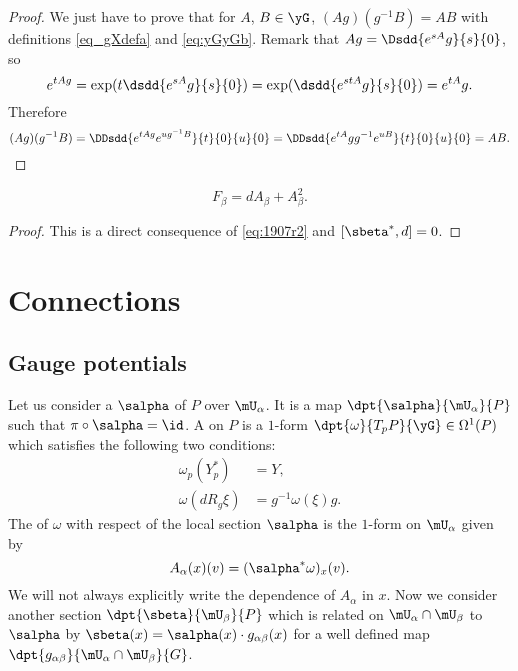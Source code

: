 \begin{proof}
We just have to prove that for $A$, $B\in\yG$, $(Ag)(g^{-1} B)=AB$ with definitions \eqref{eq_gXdefa} and \eqref{eq:yGyGb}. Remark that $Ag=\Dsdd{e^{sA}g}{s}{0}$, so
\[
  e^{tAg}=\exp(t\dsdd{e^{sA}g}{s}{0})=\exp(\dsdd{e^{stA}g}{s}{0})=e^{tA}g.
\]
Therefore
\[
  (Ag)(g^{-1} B)=\DDsdd{  e^{tAg}e^{ug^{-1} B}  }{t}{0}{u}{0}=\DDsdd{  e^{tA}gg^{-1} e^{uB}  }{t}{0}{u}{0}=AB.
\]
\end{proof}

\begin{lemma}
\begin{equation}
    F_{\beta}=dA_{\beta}+A_{\beta}^2.
\end{equation}
\end{lemma}

\begin{proof}
This is  a direct consequence of \eqref{eq:1907r2} and $[\sbeta^*,d]=0$.
\end{proof}


\section{Connections}

\subsection{Gauge potentials}

Let us consider a  $\salpha$ of $P$ over $\mU_{\alpha}$. It is a map $\dpt{\salpha}{\mU_{\alpha}}{P}$ such that $\pi\circ\salpha=\id$. A  on $P$ is a $1$-form $\dpt{\omega}{T_pP}{\yG}\in\Omega^1(P)$ which satisfies the following two conditions:
\begin{subequations}
\begin{align}
   \omega_p(Y^*_p)&=Y,   \label{conn_1}\\
   \omega(dR_g\xi)&=g^{-1}\omega(\xi)g.\label{conn_2}
\end{align}
\end{subequations}
The  of $\omega$ with respect of the local section\label{PgLocSecConn} $\salpha$ is  the $1$-form on $\mU_{\alpha}$ given by
\begin{equation}
          A_{\alpha}(x)(v)=(\salpha^*\omega)_x(v).
\end{equation}
We will not always explicitly write the dependence of $A_{\alpha}$ in $x$. Now we consider another section $\dpt{\sbeta}{\mU_{\beta}}{P}$ which is related on $\mU_{\alpha}\cap\mU_{\beta}$ to $\salpha$ by $\sbeta(x)=\salpha(x)\cdot g_{\alpha\beta}(x)$ for a well defined map $\dpt{g_{\alpha\beta}}{\mU_{\alpha}\cap\mU_{\beta}}{G}$.

